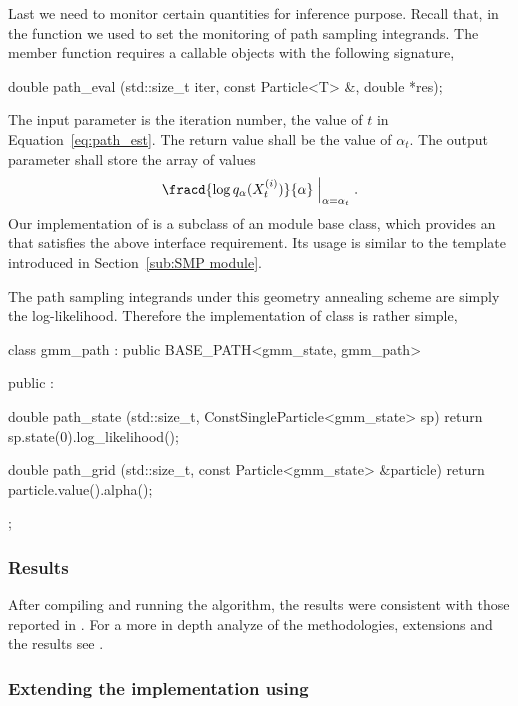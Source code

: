 \documentclass[11pt, fontset=Minion, showoverfull,
bib, mintcode, minted=cache]{marticle}
\begin{document}
Last we need to monitor certain quantities for inference purpose. Recall that,
in the  function we used
 to set the monitoring of path
sampling integrands. The  member function requires a
callable objects with the following signature,
\begin{cppcode}
double path_eval (std::size_t iter, const Particle<T> &, double *res);
\end{cppcode}
The input parameter  is the iteration number, the value of $t$
in Equation~\ref{eq:path_est}. The return value shall be the value of
$\alpha_t$. The output parameter  shall store the array of
values
\begin{equation*}
  \fracd{\log q_{\alpha}(X_t^{(i)})}{\alpha}\Bigm|_{\alpha = \alpha_t}.
\end{equation*}
Our implementation of  is a subclass of an \smp module
base class, which provides an  that satisfies the above
interface requirement. Its usage is similar to the 
template introduced in Section~\ref{sub:SMP module}.

The path sampling integrands under this geometry annealing scheme are simply
the log-likelihood. Therefore the implementation of  class
is rather simple,
\begin{cppcode}
class gmm_path : public BASE_PATH<gmm_state, gmm_path>
{
    public :

    double path_state (std::size_t, ConstSingleParticle<gmm_state> sp)
    {return sp.state(0).log_likelihood();}

    double path_grid (std::size_t, const Particle<gmm_state> &particle)
    {return particle.value().alpha();}
};
\end{cppcode}

\subsubsection{Results}

After compiling and running the algorithm, the results were consistent with
those reported in \textcite{DelMoral:2006hc}. For a more in depth analyze of the
methodologies, extensions and the results see \textcite{Zhou2013mc}.

\subsubsection{Extending the implementation using \lmpi}
\end{document}
